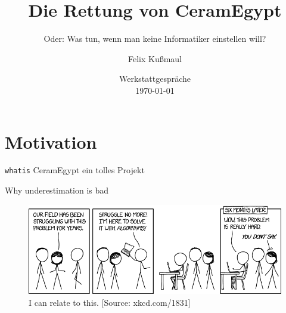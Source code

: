 \documentclass[xcolor=x11names, aspectratio=169,usenames,dvipsnames]{beamer}
\author[F.\ Kußmaul]{\large Felix Kußmaul\inst{1}}
\title[Mining Paper Catalogues]{\Large Die Rettung von CeramEgypt}
\subtitle{\normalsize Oder: Was tun, wenn man keine Informatiker einstellen will?}
\institute[UzK]{\inst{1} Archäologisches Institut, Universität zu Köln}
\date[\today]{\vspace*{1em}Werkstattgespräche\\[.5em] \today\vspace*{1em}}
\begin{document}
\begin{frame}[plain]
\titlepage
\end{frame}

\section{Motivation}

\begin{frame}{\texttt{whatis} CeramEgypt}
ein tolles Projekt
\end{frame}

\begin{frame}{Why underestimation is bad}
\begin{center}
\begin{figure}
\includegraphics[width=\textwidth]{img/xkcd.png}
\caption{I can relate to this. [Source: xkcd.com/1831]}
\end{figure}
\end{center}
\end{frame}
\end{document}
